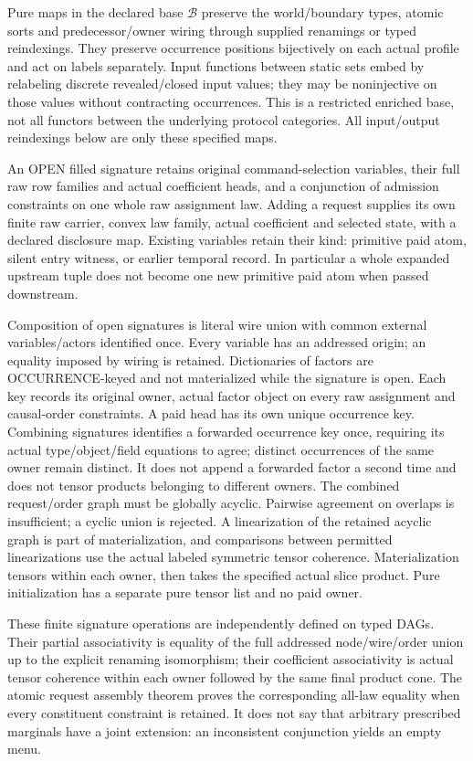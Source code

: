 \documentclass[11pt]{article}\usepackage{amsmath,amssymb,amsthm,geometry}\geometry{margin=1in}
\begin{document}
Pure maps in the declared base $\mathcal B$ preserve the world/boundary types, atomic sorts and predecessor/owner wiring through supplied renamings or typed reindexings. They preserve occurrence positions bijectively on each actual profile and act on labels separately. Input functions between static sets embed by relabeling discrete revealed/closed input values; they may be noninjective on those values without contracting occurrences. This is a restricted enriched base, not all functors between the underlying protocol categories. All input/output reindexings below are only these specified maps.

An OPEN filled signature retains original command-selection variables, their full raw row families and actual coefficient heads, and a conjunction of admission constraints on one whole raw assignment law. Adding a request supplies its own finite raw carrier, convex law family, actual coefficient and selected state, with a declared disclosure map. Existing variables retain their kind: primitive paid atom, silent entry witness, or earlier temporal record. In particular a whole expanded upstream tuple does not become one new primitive paid atom when passed downstream.

Composition of open signatures is literal wire union with common external variables/actors identified once. Every variable has an addressed origin; an equality imposed by wiring is retained. Dictionaries of factors are OCCURRENCE-keyed and not materialized while the signature is open. Each key records its original owner, actual factor object on every raw assignment and causal-order constraints. A paid head has its own unique occurrence key. Combining signatures identifies a forwarded occurrence key once, requiring its actual type/object/field equations to agree; distinct occurrences of the same owner remain distinct. It does not append a forwarded factor a second time and does not tensor products belonging to different owners. The combined request/order graph must be globally acyclic. Pairwise agreement on overlaps is insufficient; a cyclic union is rejected. A linearization of the retained acyclic graph is part of materialization, and comparisons between permitted linearizations use the actual labeled symmetric tensor coherence. Materialization tensors within each owner, then takes the specified actual slice product. Pure initialization has a separate pure tensor list and no paid owner.

These finite signature operations are independently defined on typed DAGs. Their partial associativity is equality of the full addressed node/wire/order union up to the explicit renaming isomorphism; their coefficient associativity is actual tensor coherence within each owner followed by the same final product cone. The atomic request assembly theorem proves the corresponding all-law equality when every constituent constraint is retained. It does not say that arbitrary prescribed marginals have a joint extension: an inconsistent conjunction yields an empty menu.
\end{document}

